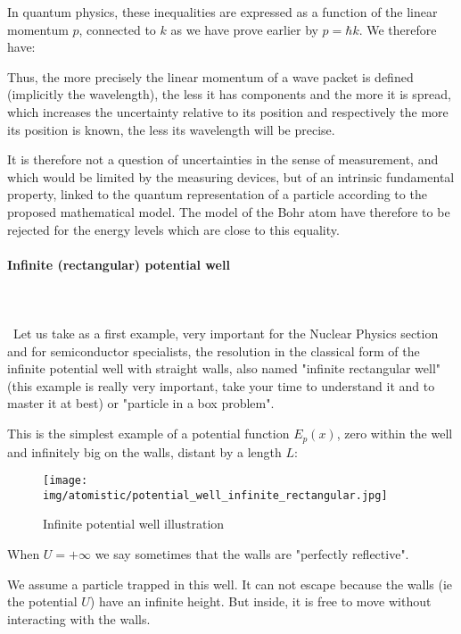 	In quantum physics, these inequalities are expressed as a function of the linear momentum $p$, connected to $k$ as we have prove earlier by $p=\hbar k$. We therefore have:
	
	Thus, the more precisely the linear momentum of a wave packet is defined (implicitly the wavelength), the less it has components and the more it is spread, which increases the uncertainty relative to its position and respectively the more its position is known, the less its wavelength will be precise.

	It is therefore not a question of uncertainties in the sense of measurement, and which would be limited by the measuring devices, but of an intrinsic fundamental property, linked to the quantum representation of a particle according to the proposed mathematical model. The model of the Bohr atom have therefore to be rejected for the energy levels which are close to this equality.
	
	\pagebreak
	\paragraph{Infinite (rectangular) potential well}\label{quantum potential well}\mbox{}\\\\\
	Let us take as a first example, very important for the Nuclear Physics section and for semiconductor specialists, the resolution in the classical form of the infinite potential well with straight walls, also named "infinite rectangular well" (this example is really very important, take your time to understand it and to master it at best) or "particle in a box problem".

	This is the simplest example of a potential function $E_p(x)$, zero within the well and infinitely big on the walls, distant by a length $L$:
	\begin{figure}[H]
		\centering
		\texttt{[image: img/atomistic/potential\_well\_infinite\_rectangular.jpg]}	
		\caption{Infinite potential well illustration}
	\end{figure} 
	\begin{tcolorbox}[title=Remark,colframe=black,arc=10pt]
	When $U=+\infty$ we say sometimes that the walls are "perfectly reflective".
	\end{tcolorbox}
	We assume a particle trapped in this well. It can not escape because the walls (ie the potential $U$) have an infinite height. But inside, it is free to move without interacting with the walls.


